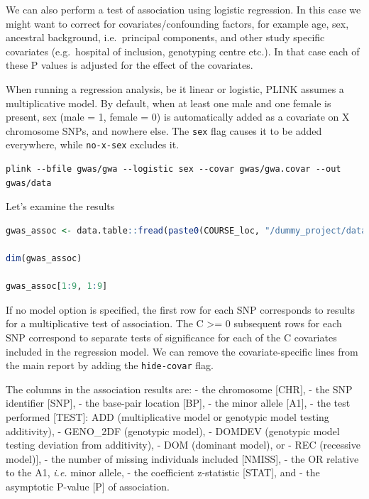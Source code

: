 \documentclass[
]{book}
\newcommand{\passthrough}[1]{#1}
\begin{document}
We can also perform a test of association using logistic regression. In this case we might want to correct for covariates/confounding factors, for example age, sex, ancestral background, i.e.~principal components, and other study specific covariates (e.g.~hospital of inclusion, genotyping centre etc.). In that case each of these P values is adjusted for the effect of the covariates.

When running a regression analysis, be it linear or logistic, PLINK assumes a multiplicative model. By default, when at least one male and one female is present, sex (male = 1, female = 0) is automatically added as a covariate on X chromosome SNPs, and nowhere else. The \passthrough{\lstinline!sex!} flag causes it to be added everywhere, while \passthrough{\lstinline!no-x-sex!} excludes it.

\begin{lstlisting}
plink --bfile gwas/gwa --logistic sex --covar gwas/gwa.covar --out gwas/data
\end{lstlisting}

Let's examine the results

\begin{lstlisting}[language=R]
gwas_assoc <- data.table::fread(paste0(COURSE_loc, "/dummy_project/data.assoc.logistic"))

dim(gwas_assoc)

gwas_assoc[1:9, 1:9]
\end{lstlisting}

If no model option is specified, the first row for each SNP corresponds to results for a multiplicative test of association. The C \textgreater= 0 subsequent rows for each SNP correspond to separate tests of significance for each of the C covariates included in the regression model. We can remove the covariate-specific lines from the main report by adding the \passthrough{\lstinline!hide-covar!} flag.

The columns in the association results are:
- the chromosome {[}CHR{]},
- the SNP identifier {[}SNP{]},
- the base-pair location {[}BP{]},
- the minor allele {[}A1{]},
- the test performed {[}TEST{]}: ADD (multiplicative model or genotypic model testing additivity),
- GENO\_2DF (genotypic model),
- DOMDEV (genotypic model testing deviation from additivity),
- DOM (dominant model), or
- REC (recessive model){]},
- the number of missing individuals included {[}NMISS{]},
- the OR relative to the A1, \emph{i.e.} minor allele,
- the coefficient z-statistic {[}STAT{]}, and
- the asymptotic P-value {[}P{]} of association.
\end{document}
